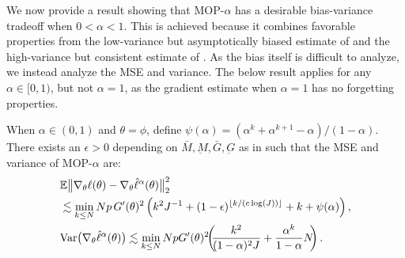 \documentclass[9pt,twocolumn,pnasresearcharticle]{pnas-new}
\newcommand\arxiv[2]{#2} %
\begin{document}
We now provide a result showing that MOP-$\alpha$ has a desirable bias-variance tradeoff when $0<\alpha<1$.
This is achieved because it combines favorable properties from the low-variance but asymptotically biased estimate of \cite{naesseth18} and the high-variance but consistent estimate of \cite{poyiadjis11}. 
As the bias itself is difficult to analyze, we instead analyze the MSE and variance. 
The below result applies for any $\alpha \in [0,1)$, but not $\alpha=1$, as the gradient estimate when $\alpha=1$ has no forgetting properties. 

\begin{thm}
    \label{thm:mop-biasvar}
    When $\alpha\in (0,1)$ and $\theta=\phi$, define $\psi(\alpha)=(\alpha^k  + \alpha^{k+1} - \alpha)/(1-\alpha)$. 
    There exists an $\epsilon>0$ depending on $\bar{M}, \underbar{M}, \bar{G}, \underbar{G}$ as in \cite{karjalainen23} such that the MSE and variance of MOP-$\alpha$ are:
    \vspace*{-1ex}
    \arxiv{\begin{eqnarray}
        \E\big\|\nabla_\theta\ell(\theta) - \nabla_\theta \hat\ell^\alpha(\theta)\big\|_2^2 
        &\lesssim& \min_{k \leq N} Np \, G'(\theta)^2\left(k^2J^{-1}+(1-\epsilon)^{\floor{k/(c\log(J))}}+k+\psi(\alpha)\right), \label{eq:mop-mse}
        \\
        \Var\big(\nabla_\theta \hat\ell^{\alpha}(\theta)\big) &\lesssim& \min_{k\leq N} Np \, G'(\theta)^2\left(\frac{k^2}{(1-\alpha)^2J} + \frac{\alpha^{k}}{1-\alpha}N\right). \label{eq:mop-variance}
        \end{eqnarray}}{\begin{align}
        &\mathbb{E}\big\|\nabla_\theta\ell(\theta) - \nabla_\theta \hat\ell^\alpha(\theta)\big\|_2^2 \label{eq:mop-mse}\\
        &\lesssim \min_{k \leq N} Np \, G'(\theta)^2\left(k^2J^{-1}+(1-\epsilon)^{\lfloor k/(c\log(J)) \rfloor}+k+\psi(\alpha)\right), \nonumber 
        \\
        &\mathrm{Var}\big(\nabla_\theta \hat\ell^{\alpha}(\theta)\big) \lesssim \min_{k\leq N} Np  G'(\theta)^2\hspace{-0.8ex}\left(\hspace{-0.8ex}\frac{k^2}{(1-\alpha)^2J} + \frac{\alpha^{k}}{1-\alpha}N\hspace{-0.8ex}\right). \label{eq:mop-variance}
        \end{align}}
\end{thm}
\arxiv{}{\vspace*{-1ex}}
\end{document}
